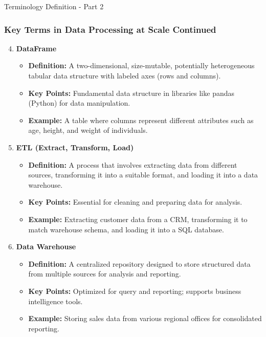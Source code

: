 \documentclass[aspectratio=169]{beamer}
\begin{document}
\begin{frame}[fragile]{Terminology Definition - Part 2}
    \frametitle{Key Terms in Data Processing at Scale Continued}
    \begin{enumerate}
        \setcounter{enumi}{3} %
        \item \textbf{DataFrame}
        \begin{itemize}
            \item \textbf{Definition:} A two-dimensional, size-mutable, potentially heterogeneous tabular data structure with labeled axes (rows and columns).
            \item \textbf{Key Points:} Fundamental data structure in libraries like pandas (Python) for data manipulation.
            \item \textbf{Example:} A table where columns represent different attributes such as age, height, and weight of individuals.
        \end{itemize}

        \item \textbf{ETL (Extract, Transform, Load)}
        \begin{itemize}
            \item \textbf{Definition:} A process that involves extracting data from different sources, transforming it into a suitable format, and loading it into a data warehouse.
            \item \textbf{Key Points:} Essential for cleaning and preparing data for analysis.
            \item \textbf{Example:} Extracting customer data from a CRM, transforming it to match warehouse schema, and loading it into a SQL database.
        \end{itemize}

        \item \textbf{Data Warehouse}
        \begin{itemize}
            \item \textbf{Definition:} A centralized repository designed to store structured data from multiple sources for analysis and reporting.
            \item \textbf{Key Points:} Optimized for query and reporting; supports business intelligence tools.
            \item \textbf{Example:} Storing sales data from various regional offices for consolidated reporting.
        \end{itemize}
    \end{enumerate}
\end{frame}
\end{document}
